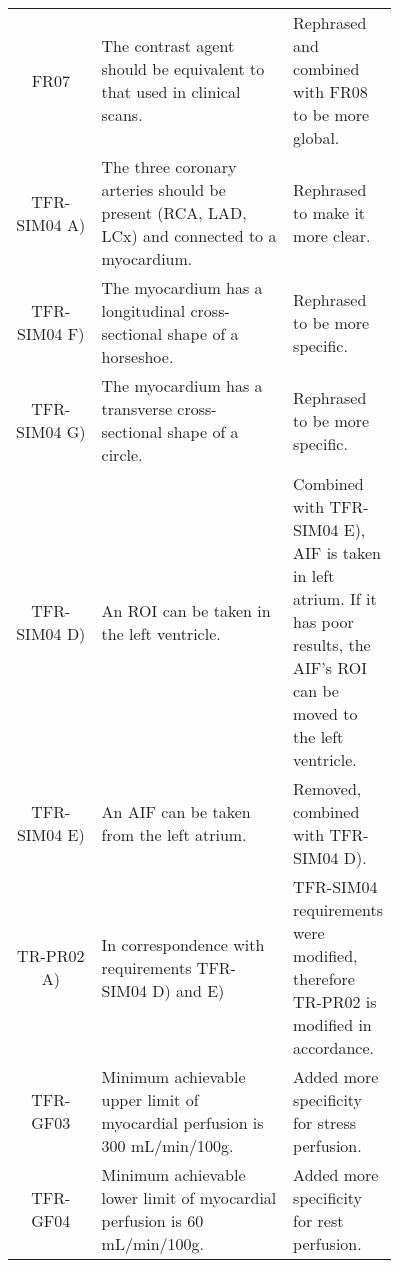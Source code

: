 \begin{longtable}{|c|p{0.5\linewidth}|p{0.26\linewidth}|}
		FR07 & The contrast agent should be equivalent to that used in clinical scans. & Rephrased and combined with FR08 to be more global. \\
		TFR-SIM04 A) & The three coronary arteries should be present (RCA, LAD, LCx) and connected to a myocardium. & Rephrased to make it more clear. \\
		TFR-SIM04 F) & The myocardium has a longitudinal cross-sectional shape of a horseshoe. & Rephrased to be more specific. \\
		TFR-SIM04 G) &  The myocardium has a transverse cross-sectional shape of a circle. & Rephrased to be more specific. \\
		TFR-SIM04 D) & An ROI can be taken in the left ventricle. & Combined with TFR-SIM04 E), AIF is taken in left atrium. If it has poor results, the AIF's ROI can be moved to the left ventricle. \\
	TFR-SIM04 E) & An AIF can be taken from the left atrium. & Removed, combined with TFR-SIM04 D).\\
	TR-PR02 A) & In correspondence with requirements TFR-SIM04 D) and E) & TFR-SIM04 requirements were modified, therefore TR-PR02 is modified in accordance. \\
	TFR-GF03 & Minimum achievable upper limit of myocardial perfusion is 300 mL/min/100g. & Added more specificity for stress perfusion.  \\
	TFR-GF04 & Minimum achievable lower limit of myocardial perfusion is 60 mL/min/100g. & Added more specificity for rest perfusion. \\
		\hline
	\end{longtable}
